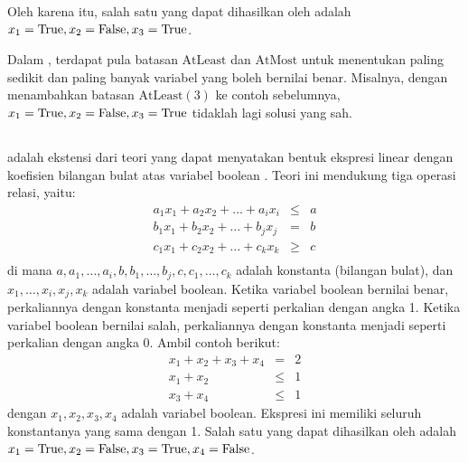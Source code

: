 \noindent Oleh karena itu, salah satu  yang dapat dihasilkan oleh  adalah \(x_1 = \mathrm{True}, x_2 = \mathrm{False}, x_3 = \mathrm{True}\).

Dalam , terdapat pula batasan \(\mathrm{AtLeast}\) dan \(\mathrm{AtMost}\) untuk menentukan paling sedikit dan paling banyak variabel yang boleh bernilai benar. Misalnya, dengan menambahkan batasan \(\mathrm{AtLeast}(3)\) ke contoh sebelumnya, \(x_1 = \mathrm{True}, x_2 = \mathrm{False}, x_3 = \mathrm{True}\) tidaklah lagi solusi yang sah.

\subsection{}

 adalah ekstensi dari teori  yang dapat menyatakan bentuk ekspresi linear dengan koefisien bilangan bulat atas variabel boolean \citep{yurichev}. Teori ini mendukung tiga operasi relasi, yaitu:
\[
\begin{array}{lcl}
	a_1 x_1 + a_2 x_2 + \ldots + a_i x_i &\leq& a \\
	b_1 x_1 + b_2 x_2 + \ldots + b_j x_j &=& b \\
	c_1 x_1 + c_2 x_2 + \ldots + c_k x_k &\geq& c \\
\end{array}
\]
di mana \(a, a_1, \ldots, a_i, b, b_1, \ldots, b_j, c, c_1, \ldots, c_k\) adalah konstanta  (bilangan bulat), dan \(x_1,\ldots,x_i,x_j,x_k\) adalah variabel boolean. Ketika variabel boolean bernilai benar, perkaliannya dengan konstanta menjadi seperti perkalian dengan angka 1. Ketika variabel boolean bernilai salah, perkaliannya dengan konstanta menjadi seperti perkalian dengan angka 0. Ambil contoh berikut:
\[
\begin{array}{rcl}
	x_1 + x_2 + x_3 + x_4 &=& 2 \\
	x_1 + x_2 &\leq& 1 \\
	x_3 + x_4 &\leq& 1
\end{array}
\]
dengan \(x_1, x_2, x_3, x_4\) adalah variabel boolean. Ekspresi ini memiliki seluruh konstantanya yang sama dengan 1. Salah satu  yang dapat dihasilkan oleh  adalah \(x_1 = \mathrm{True}, x_2 = \mathrm{False}, x_3 = \mathrm{True}, x_4 = \mathrm{False}\).

\subsection{}

